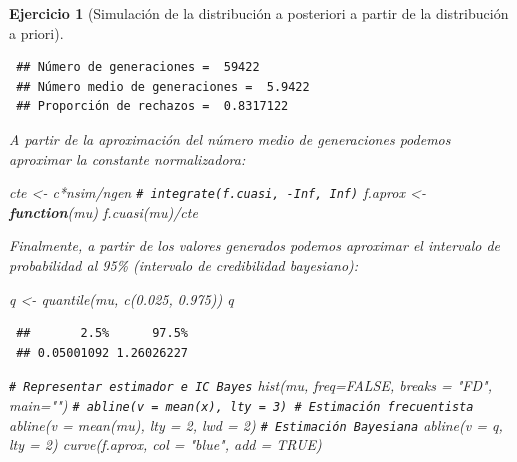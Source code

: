 \documentclass[
]{book}
\newenvironment{Shaded}{\begin{snugshade}}{\end{snugshade}}
\newcommand{\AttributeTok}[1]{\textcolor[rgb]{0.77,0.63,0.00}{#1}}
\newcommand{\CommentTok}[1]{\textcolor[rgb]{0.56,0.35,0.01}{\textit{#1}}}
\newcommand{\ConstantTok}[1]{\textcolor[rgb]{0.00,0.00,0.00}{#1}}
\newcommand{\ControlFlowTok}[1]{\textcolor[rgb]{0.13,0.29,0.53}{\textbf{#1}}}
\newcommand{\DecValTok}[1]{\textcolor[rgb]{0.00,0.00,0.81}{#1}}
\newcommand{\FloatTok}[1]{\textcolor[rgb]{0.00,0.00,0.81}{#1}}
\newcommand{\FunctionTok}[1]{\textcolor[rgb]{0.00,0.00,0.00}{#1}}
\newcommand{\NormalTok}[1]{#1}
\newcommand{\OtherTok}[1]{\textcolor[rgb]{0.56,0.35,0.01}{#1}}
\newcommand{\SpecialCharTok}[1]{\textcolor[rgb]{0.00,0.00,0.00}{#1}}
\newcommand{\StringTok}[1]{\textcolor[rgb]{0.31,0.60,0.02}{#1}}
\theoremstyle{break}
\newtheorem{exercise}{Ejercicio}[chapter]
\theoremstyle{nonumberplain}
\renewcommand{\CommentTok}[1]{\textcolor[rgb]{0.41,0.41,0.41}{\texttt{#1}}}
\begin{document}
\begin{exercise}[Simulación de la distribución a posteriori a partir de la distribución a priori]
\begin{enumerate}
\begin{verbatim}
 ## Número de generaciones =  59422
 ## Número medio de generaciones =  5.9422
 ## Proporción de rechazos =  0.8317122
\end{verbatim}

  A partir de la aproximación del número medio de generaciones podemos aproximar la constante normalizadora:

\begin{Shaded}
\begin{Highlighting}[]
\NormalTok{cte }\OtherTok{\textless{}{-}}\NormalTok{ c}\SpecialCharTok{*}\NormalTok{nsim}\SpecialCharTok{/}\NormalTok{ngen}
\CommentTok{\# integrate(f.cuasi, {-}Inf, Inf)}
\NormalTok{f.aprox }\OtherTok{\textless{}{-}} \ControlFlowTok{function}\NormalTok{(mu) }\FunctionTok{f.cuasi}\NormalTok{(mu)}\SpecialCharTok{/}\NormalTok{cte}
\end{Highlighting}
\end{Shaded}

  Finalmente, a partir de los valores generados podemos aproximar el intervalo de probabilidad al 95\% (intervalo de credibilidad bayesiano):

\begin{Shaded}
\begin{Highlighting}[]
\NormalTok{q }\OtherTok{\textless{}{-}} \FunctionTok{quantile}\NormalTok{(mu, }\FunctionTok{c}\NormalTok{(}\FloatTok{0.025}\NormalTok{, }\FloatTok{0.975}\NormalTok{))}
\NormalTok{q}
\end{Highlighting}
\end{Shaded}

\begin{verbatim}
 ##       2.5%      97.5% 
 ## 0.05001092 1.26026227
\end{verbatim}

\begin{Shaded}
\begin{Highlighting}[]
\CommentTok{\# Representar estimador e IC Bayes}
\FunctionTok{hist}\NormalTok{(mu, }\AttributeTok{freq=}\ConstantTok{FALSE}\NormalTok{, }\AttributeTok{breaks =} \StringTok{"FD"}\NormalTok{, }\AttributeTok{main=}\StringTok{""}\NormalTok{)}
\CommentTok{\# abline(v = mean(x), lty = 3) \# Estimación frecuentista}
\FunctionTok{abline}\NormalTok{(}\AttributeTok{v =} \FunctionTok{mean}\NormalTok{(mu), }\AttributeTok{lty =} \DecValTok{2}\NormalTok{, }\AttributeTok{lwd =} \DecValTok{2}\NormalTok{)  }\CommentTok{\# Estimación Bayesiana}
\FunctionTok{abline}\NormalTok{(}\AttributeTok{v =}\NormalTok{ q, }\AttributeTok{lty =} \DecValTok{2}\NormalTok{)}
\FunctionTok{curve}\NormalTok{(f.aprox, }\AttributeTok{col =} \StringTok{"blue"}\NormalTok{, }\AttributeTok{add =} \ConstantTok{TRUE}\NormalTok{)}
\end{Highlighting}
\end{Shaded}


\end{enumerate}
\end{exercise}
\end{document}
